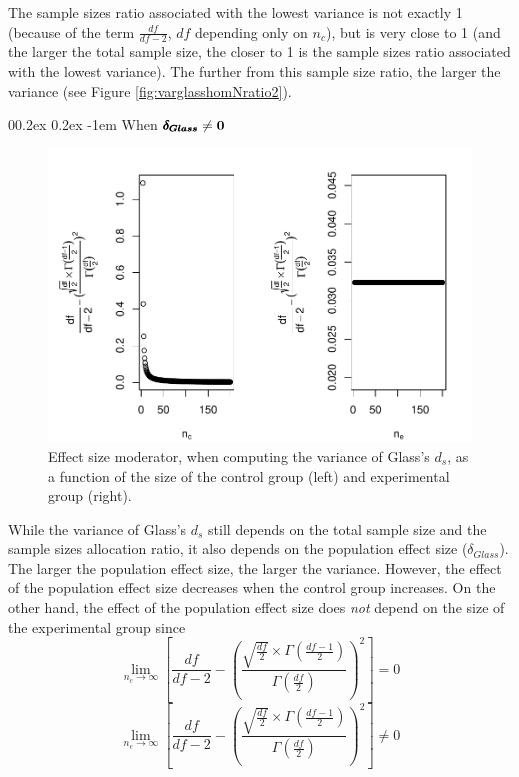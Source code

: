 \documentclass[
  english,
  man,mask]{apa6}
\makeatletter
\let\oldparagraph\paragraph
\renewcommand{\paragraph}[1]{\oldparagraph{#1}\mbox{}}
\renewcommand{\paragraph}{\@startsection{paragraph}{4}{\parindent}%
  {0\baselineskip \@plus 0.2ex \@minus 0.2ex}%
  {-1em}%
  {\normalfont\normalsize\bfseries\itshape\typesectitle}}
\makeatother
\begin{document}
The sample sizes ratio associated with the lowest variance is not exactly 1 (because of the term \(\frac{df}{df-2}\), \(df\) depending only on \(n_c\)), but is very close to 1 (and the larger the total sample size, the closer to 1 is the sample sizes ratio associated with the lowest variance). The further from this sample size ratio, the larger the variance (see Figure \ref{fig:varglasshomNratio2}).

\hypertarget{when-bf-pmbdelta_glass-neq-0}{%
\paragraph{\texorpdfstring{When \(\bf \pmb{\delta_{Glass}} \neq 0\)}{When \textbackslash bf \textbackslash pmb\{\textbackslash delta\_\{Glass\}\} \textbackslash neq 0}}\label{when-bf-pmbdelta_glass-neq-0}}

\begin{figure}
\centering
\includegraphics{Theoretical-Variance-of-all-estimators-as-a-function-of-population-parameters_files/figure-latex/ESmoderatorGlassNsize2-1.pdf}
\caption{\label{fig:ESmoderatorGlassNsize2}Effect size moderator, when computing the variance of Glass's \(d_s\), as a function of the size of the control group (left) and experimental group (right).}
\end{figure}

While the variance of Glass's \(d_s\) still depends on the total sample size and the sample sizes allocation ratio, it also depends on the population effect size (\(\delta_{Glass}\)). The larger the population effect size, the larger the variance. However, the effect of the population effect size decreases when the control group increases. On the other hand, the effect of the population effect size does \emph{not} depend on the size of the experimental group since\\
\[\lim_{n_c\rightarrow \infty}\left[\frac{df}{df-2} - \left( \frac{\sqrt{\frac{df}{2}} \times \Gamma \left(\frac{df-1}{2} \right)}{\Gamma \left( \frac{df}{2}\right)}\right)^2 \right]=0\]
\[\lim_{n_e\rightarrow \infty}\left[\frac{df}{df-2} - \left( \frac{\sqrt{\frac{df}{2}} \times \Gamma \left(\frac{df-1}{2} \right)}{\Gamma \left( \frac{df}{2}\right)}\right)^2 \right] \neq 0\]
\end{document}
